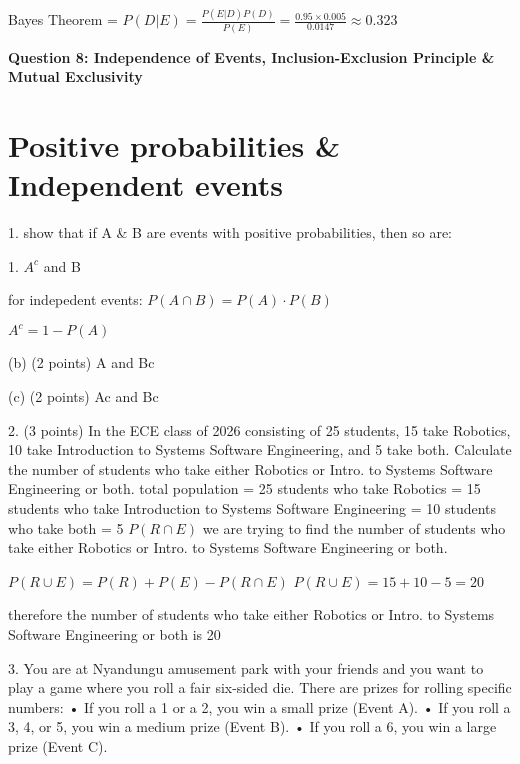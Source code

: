 \documentclass{article}
\begin{document}
Bayes Theorem = \(P(D|E) = \frac{P(E|D)P(D)}{P(E)} = \frac{0.95 \times 0.005}{0.0147} \approx 0.323\)

\begin{center}
    \large \textbf{Question 8: Independence of Events, Inclusion-Exclusion Principle \& Mutual Exclusivity}
\end{center}

\section{Positive probabilities \& Independent events}
1. show that if A \& B are events with positive probabilities, then so are:

1. \(A^c\) and B 

for indepedent events: \(P(A \cap B) = P(A) \cdot P(B)\)\newline

\(A^c = 1-P(A)\)

(b) (2 points) A and Bc

(c) (2 points) Ac and Bc\newline

2. (3 points) In the ECE class of 2026 consisting of 25 students, 15 take Robotics, 10 take Introduction
to Systems Software Engineering, and 5 take both. Calculate the number of students who
take either Robotics or Intro. to Systems Software Engineering or both.\newline\newline
total population = 25\newline
students who take Robotics = 15\newline
students who take Introduction to Systems Software Engineering = 10\newline
students who take both = 5 \(P(R \cap E)\)\newline
we are trying to find the number of students who take either Robotics or Intro. to Systems Software Engineering or both.\newline

\(P(R \cup E ) = P(R) + P(E) - P(R \cap E)\)\newline
\(P(R \cup E ) = 15 + 10 - 5 = 20\)\newline

therefore the number of students who take either Robotics or Intro. to Systems Software Engineering or both is 20\newline

3. You are at Nyandungu amusement park with your friends and you want to play a game where you
roll a fair six-sided die. There are prizes for rolling specific numbers:\newline
• If you roll a 1 or a 2, you win a small prize (Event A).\newline
• If you roll a 3, 4, or 5, you win a medium prize (Event B).\newline
• If you roll a 6, you win a large prize (Event C).\newline
\end{document}
